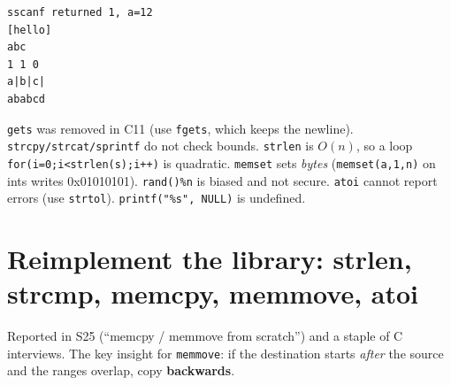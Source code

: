 \documentclass[10pt,a4paper,openany,oneside]{report}
\newcommand{\prio}[1]{\texorpdfstring{\ifcase#1\or{\color{gold}\ding{72}}\or{\color{gold}\ding{72}\ding{72}}\or{\color{gold}\ding{72}\ding{72}\ding{72}}\fi}{}}
\begin{document}
\begin{lstlisting}[style=out]
sscanf returned 1, a=12
[hello]
abc
1 1 0
a|b|c|
ababcd
\end{lstlisting}
\begin{trapbox}
\texttt{gets} was removed in C11 (use \texttt{fgets}, which keeps the newline). \texttt{strcpy/strcat/sprintf} do not check bounds. \texttt{strlen} is $O(n)$, so a loop \texttt{for(i=0;i<strlen(s);i++)} is quadratic. \texttt{memset} sets \emph{bytes} (\texttt{memset(a,1,n)} on ints writes 0x01010101). \texttt{rand()\%n} is biased and not secure. \texttt{atoi} cannot report errors (use \texttt{strtol}). \texttt{printf("\%s", NULL)} is undefined.
\end{trapbox}

\section{Reimplement the library: strlen, strcmp, memcpy, memmove, atoi \prio{3}}
Reported in S25 (``memcpy / memmove from scratch'') and a staple of C interviews. The key insight for \texttt{memmove}: if the destination starts \emph{after} the source and the ranges overlap, copy \textbf{backwards}.
\end{document}
